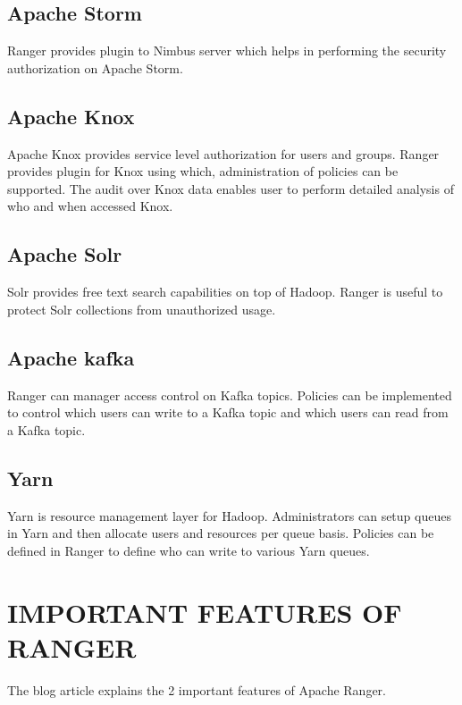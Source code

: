 \documentclass[9pt,twocolumn,twoside]{../../styles/osajnl}
\begin{document}
\subsection{Apache Storm}
Ranger provides plugin to Nimbus server which helps in performing the
security authorization on Apache Storm.

\subsection{Apache Knox}
Apache Knox provides service level authorization for users and groups. Ranger
 provides plugin for Knox using which, administration of policies can be
 supported. The audit over Knox data enables user to perform detailed
 analysis of who and when accessed Knox.

\subsection{Apache Solr}
Solr provides free text search capabilities on top of Hadoop. Ranger is
useful to protect Solr collections from unauthorized usage.

\subsection{Apache kafka}
Ranger can manager access control on Kafka topics. Policies can be
implemented to control which users can write to a Kafka topic and which users
can read from a Kafka topic.

\subsection{Yarn}
Yarn is resource management layer for Hadoop. Administrators can setup queues
 in Yarn and then allocate users and resources per queue basis. Policies can
 be defined in Ranger to define who can write to various Yarn queues.
 
 \section{IMPORTANT FEATURES OF RANGER}

 
The blog article \cite{www-ranger-key-features} explains the 2
important features of Apache Ranger. 
\end{document}
